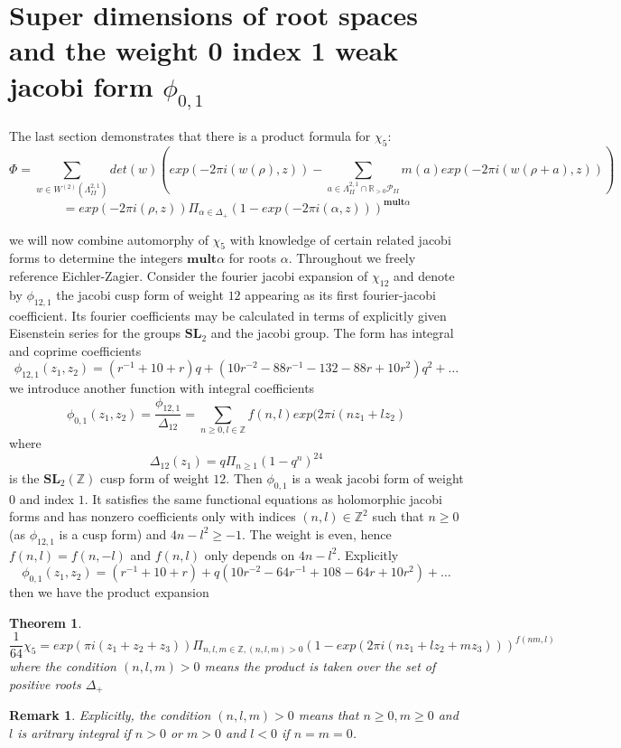 \documentclass[9pt]{amsart} \usepackage[utf8]{inputenc}
\newtheorem{theorem}{Theorem}
\newtheorem{remark}{Remark}
\newcommand{\Z}{\mathbb{Z}} \newcommand{\C}{\mathbb{C}}
\newcommand{\R}{\mathbb{R}} \newcommand{\La}{\Lambda}
\newcommand{\SL}{\mathbf{SL}}
\newcommand{\Poly}{\mathcal{P}}
\begin{document}
\section{Super dimensions of root spaces and the weight 0 index 1 weak jacobi
form $\phi_{0,1}$}

The last section demonstrates that there is a product formula for
$\chi_5$:
$$\Phi = \sum_{w \in W^{(2)}(\La^{2,1}_{II})} det(w)
(exp(-2\pi i(w(\rho), z)) - \sum_{a\in \La^{2,1}_{II} \cap \R_{>0}
\Poly_{II}} m(a) exp(-2\pi i(w(\rho + a), z)) ) $$ $$= exp(-2\pi i(\rho,z))
\Pi_{\alpha \in \Delta_+} (1 - exp(-2\pi i
(\alpha,z)))^{\textbf{mult}\alpha}$$

we will now combine automorphy of $\chi_5$ with knowledge of certain
related jacobi forms to determine the integers $\textbf{mult}\alpha$ for
roots $\alpha$.
Throughout we freely reference Eichler-Zagier\cite{EZ:1}.
Consider the fourier jacobi expansion of $\chi_{12}$ and denote by
$\phi_{12,1}$ the jacobi cusp form of weight $12$ appearing as its first
fourier-jacobi coefficient. Its fourier coefficients may be calculated
in terms of explicitly given Eisenstein series for the groups $\SL_2$
and the jacobi group. The form has integral and coprime coefficients
$$\phi_{12,1}(z_1,z_2) = (r^{-1} + 10 + r)q + (10r^{-2} -88r^{-1} -132
-88r +10r^{2})q^2 + \ldots$$ we introduce another function with integral
coefficients $$\phi_{0,1} (z_1,z_2) =
\frac{\phi_{12,1}}{\Delta_{12}} = \sum_{n\geq 0, l\in \Z}
f(n,l)exp(2\pi i(nz_1 + lz_2)$$ where $$\Delta_{12}(z_1) = q\Pi_{n\geq
1}(1 - q^n)^{24}$$ is the $\SL_2(\Z)$ cusp form of weight $12$. Then
$\phi_{0,1}$ is a weak jacobi form of weight $0$ and index $1$. It
satisfies the same functional equations as holomorphic jacobi forms and
has nonzero coefficients only with indices $(n,l) \in \Z^2$ such that
$n\geq 0$ (as $\phi_{12,1}$ is a cusp form) and $4n - l^2 \geq -1$. The
weight is even, hence $f(n,l) = f(n,-l)$ and $f(n,l)$ only depends on
$4n-l^2$. Explicitly $$\phi_{0,1} (z_1,z_2) = (r^{-1} +10 + r) +
q(10r^{-2} - 64r^{-1} + 108  -64r + 10r^2) + \ldots$$
then we have the product expansion

\begin{theorem}
$$\frac{1}{64} \chi_5 = exp(\pi i(z_1 + z_2 + z_3)) \Pi_{n,l,m \in \Z,
(n,l,m) >0} (1 - exp(2\pi i(nz_1 + lz_2 + mz_3)))^{f(nm,l)}$$ where the
condition $(n,l,m) > 0$ means the product is taken over the set of
positive roots $\Delta_+$
\end{theorem}

\begin{remark}
Explicitly, the condition $(n,l,m) > 0$ means that $n\geq 0,m\geq 0$ and
$l$ is aritrary integral if $n>0$ or $m > 0$ and $l<0$ if $n = m = 0$.
\end{remark}
\end{document}
